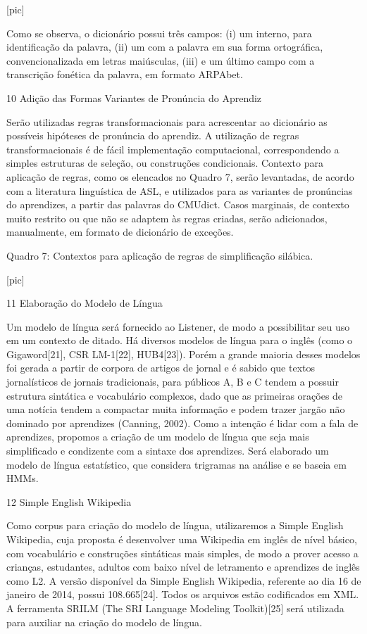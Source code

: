  [pic]

Como se observa, o dicion\'ario possui tr\^es campos: (i) um interno, para
identifica\c{c}\~ao da palavra, (ii) um com a palavra em sua forma
ortogr\'afica, convencionalizada em letras mai\'usculas, (iii) e um \'ultimo
campo com a transcri\c{c}\~ao fon\'etica da palavra, em formato ARPAbet.

10 Adi\c{c}\~ao das Formas Variantes de Pron\'uncia do Aprendiz

Ser\~ao utilizadas regras transformacionais para acrescentar ao dicion\'ario
as poss\'iveis hip\'oteses de pron\'uncia do aprendiz. A utiliza\c{c}\~ao de regras
transformacionais \'e de f\'acil implementa\c{c}\~ao computacional, correspondendo
a simples estruturas de sele\c{c}\~ao, ou constru\c{c}\~oes condicionais. Contexto
para aplica\c{c}\~ao de regras, como os elencados no Quadro 7, ser\~ao
levantadas, de acordo com a literatura lingu\'istica de ASL, e utilizados
para as variantes de pron\'uncias do aprendizes, a partir das palavras do
CMUdict. Casos marginais, de contexto muito restrito ou que n\~ao se
adaptem às regras criadas, ser\~ao adicionados, manualmente, em formato de
dicion\'ario de exce\c{c}\~oes.

Quadro 7: Contextos para aplica\c{c}\~ao de regras de simplifica\c{c}\~ao sil\'abica.

 [pic]

11 Elabora\c{c}\~ao do Modelo de L\'ingua

Um modelo de l\'ingua ser\'a fornecido ao Listener, de modo a possibilitar
seu uso em um contexto de ditado. H\'a diversos modelos de l\'ingua para o
ingl\^es (como o Gigaword{[}21{]}, CSR LM-1{[}22{]}, HUB4{[}23{]}). Por\'em
a grande maioria desses modelos foi gerada a partir de corpora de
artigos de jornal e \'e sabido que textos jornal\'isticos de jornais
tradicionais, para p\'ublicos A, B e C tendem a possuir estrutura
sint\'atica e vocabul\'ario complexos, dado que as primeiras ora\c{c}\~oes de uma
not\'icia tendem a compactar muita informa\c{c}\~ao e podem trazer jarg\~ao n\~ao
dominado por aprendizes (Canning, 2002). Como a inten\c{c}\~ao \'e lidar com a
fala de aprendizes, propomos a cria\c{c}\~ao de um modelo de l\'ingua que seja
mais simplificado e condizente com a sintaxe dos aprendizes. Ser\'a
elaborado um modelo de l\'ingua estat\'istico, que considera trigramas na
an\'alise e se baseia em HMMs.

12 Simple English Wikipedia

Como corpus para cria\c{c}\~ao do modelo de l\'ingua, utilizaremos a Simple
English Wikipedia, cuja proposta \'e desenvolver uma Wikipedia em ingl\^es
de n\'ivel b\'asico, com vocabul\'ario e constru\c{c}\~oes sint\'aticas mais simples,
de modo a prover acesso a crian\c{c}as, estudantes, adultos com baixo n\'ivel
de letramento e aprendizes de ingl\^es como L2. A vers\~ao dispon\'ivel da
Simple English Wikipedia, referente ao dia 16 de janeiro de 2014, possui
108.665{[}24{]}. Todos os arquivos est\~ao codificados em XML. A
ferramenta SRILM (The SRI Language Modeling Toolkit){[}25{]} ser\'a
utilizada para auxiliar na cria\c{c}\~ao do modelo de l\'ingua.

